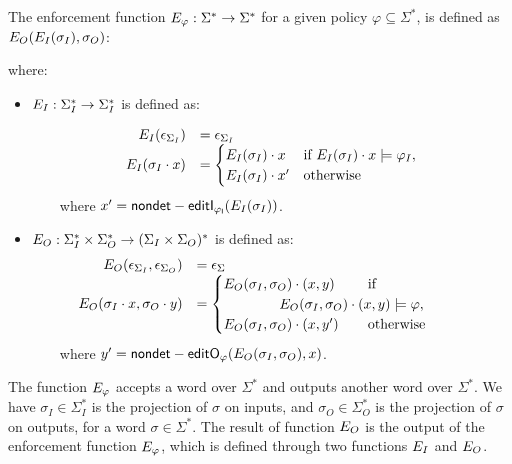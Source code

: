 \begin{definition}
	\label{def-func-E} The enforcement function $E_{\varphi}: \Sigma^* \rightarrow \Sigma^*$ for a given policy $\varphi\subseteq\Sigma^*$, is defined as $E_{O}(E_{I}(\sigma_I), \sigma_O)$:
	
	
	where:
	\begin{itemize}
		\item $E_{I}: \Sigma_I^* \rightarrow \Sigma_I^* $ is defined as:
		
		
		\[
		\begin{array}{rll}
			E_{I}(\epsilon_{\Sigma_I})& = \epsilon_{\Sigma_I} \\
			
			E_{I}(\sigma_I \cdot x) & =
			\begin{cases}
				E_{I}(\sigma_I) \cdot x &
				\mbox{if}\ E_{I}(\sigma_I)\cdot x \models \varphi_I,  \\
				E_{I}(\sigma_I) \cdot x' & \text{otherwise}
			\end{cases}
		\end{array}
		\]
		~~~~where $x'= \mathsf{{nondet}-editI_{\varphi_{I}}}(E_{I}(\sigma_I))$.
		
		\item $E_{O}: \Sigma^*_I \times \Sigma^*_O \rightarrow (\Sigma_I \times \Sigma_O)^*$ is defined as:
		\[
		\begin{array}{rll}
			\efo(\epsilon_{\Sigma_I}, \epsilon_{\Sigma_O})& = \epsilon_\Sigma\\
			\hspace{-2em}\efo(\sigma_I \cdot x, \sigma_O \cdot y) & =
			\begin{cases}
				\efo(\sigma_I, \sigma_O) \cdot (x,y) &\hspace{-5em}
				\mbox{if} \\
				~~~~~~~~~~~~\efo(\sigma_I, \sigma_O)\cdot(x,y)\models\varphi, & \\
				\efo(\sigma_I,\sigma_O) \cdot (x, y') &\hspace{-5em} \text{otherwise}
			\end{cases}
		\end{array}
		\]
		~~~~where $y'= \mathsf{{nondet}-editO_{\varphi}}(E_{O}(\sigma_I,\sigma_O), x)$.
		
	\end{itemize}
\end{definition}
The function $E_{\varphi}$ accepts a word over $\Sigma^*$ and outputs another word over $\Sigma^*$.
We have $\sigma_I \in \Sigma_I^*$ is the projection of $\sigma$ on inputs, and $\sigma_O \in \Sigma_O^*$ is the projection of $\sigma$ on outputs, for a word $\sigma\in\Sigma^*$.
The result of function $E_{O}$ is the output of the enforcement function $E_{\varphi}$, which is defined through two functions\blue{,} $E_{I}$ and $E_{O}$.

